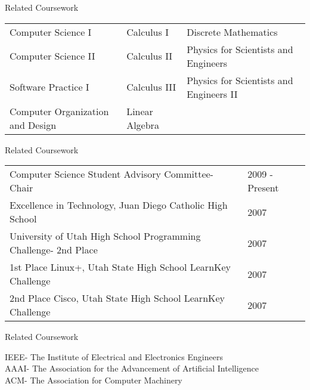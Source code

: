 \documentclass{resume}
\begin{document}

\begin{rSection}{Related Coursework}
\begin{tabular}{ l l l }
Computer Science I & Calculus I & Discrete Mathematics \\
Computer Science II & Calculus II & Physics for Scientists and Engineers \\
Software Practice I & Calculus III & Physics for Scientists and Engineers II \\
Computer Organization and Design& Linear Algebra & \\
\end{tabular}

\end{rSection}


\begin{rSection}{Related Coursework}
\begin{tabular}{ l l }
Computer Science Student Advisory Committee- Chair & 2009 - Present \\
Excellence in Technology, Juan Diego Catholic High School & 2007 \\
University of Utah High School Programming Challenge- 2nd Place & 2007 \\
1st Place Linux+, Utah State High School LearnKey Challenge & 2007 \\
2nd Place Cisco, Utah State High School LearnKey Challenge & 2007
\end{tabular}

\end{rSection}


\begin{rSection}{Related Coursework}

IEEE- The Institute of Electrical and Electronics Engineers \\
AAAI- The Association for the Advancement of Artificial Intelligence \\
ACM- The Association for Computer Machinery

\end{rSection}
\end{document}
